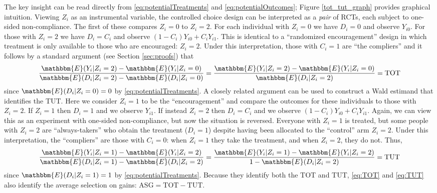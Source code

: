 \documentclass[12pt, a4paper]{article}
\begin{document}
The key insight can be read directly from \eqref{eq:potentialTreatments} and \eqref{eq:potentialOutcomes}; Figure \ref{tot_tut_graph} provides graphical intuition. %
Viewing $Z_i$ as an instrumental variable, the controlled choice design can be interpreted as a \emph{pair} of RCTs, each subject to one-sided non-compliance.
The first of these compares $Z_i=0$ to $Z_i = 2$. For each individual with $Z_i = 0$ we have $D_i = 0$ and observe $Y_{i0}$. For those with $Z_i = 2$ we have $D_i = C_i$ and observe $(1 - C_i) Y_{i0} + C_i Y_{i1}$. This is identical to a ``randomized encouragement'' design in which treatment is only available to those who are encouraged: $Z_i = 2$. Under this interpretation, those with $C_i = 1$ are ``the compliers'' and it follows by a standard argument (see Section \ref{sec:proofs}) that 
\begin{equation}
\frac{\mathbbm{E}(Y_i|Z_i=2) - \mathbbm{E}(Y_i|Z_i =0)}{\mathbbm{E}(D_i|Z_i=2)-\mathbbm{E}(D_i|Z_i=0)} = 
\frac{\mathbbm{E}(Y_i|Z_i=2) - \mathbbm{E}(Y_i|Z_i =0)}{\mathbbm{E}(D_i|Z_i=2)} = \text{TOT} 
\label{eq:TOT}
\end{equation}
since $\mathbbm{E}(D_i|Z_i=0)=0$ by \eqref{eq:potentialTreatments}. 
A closely related argument can be used to construct a Wald estimand that identifies the TUT. Here we consider $Z_i = 1$ to be the ``encouragement'' and compare the outcomes for these individuals to those with $Z_i = 2$. If $Z_i = 1$ then $D_i = 1$ and we observe $Y_{i1}$.
If instead $Z_i = 2$ then $D_i = C_i$ and we observe $(1 - C_i) Y_{i0} + C_i Y_{i1}$. Again, we can view this as an experiment with one-sided non-compliance, but now the situation is reversed. Everyone with $Z_i = 1$ is treated, but some people with $Z_i = 2$ are ``always-takers'' who obtain the treatment ($D_i = 1$) despite having been allocated to the ``control'' arm $Z_i=2$. Under this interpretation, the ``compliers'' are those with $C_i = 0$: when $Z_i=1$ they take the treatment, and when $Z_i=2$, they do not. Thus, 
\begin{equation}
\frac{\mathbbm{E}(Y_i|Z_i=1) - \mathbbm{E}(Y_i|Z_i =2)}{\mathbbm{E}(D_i|Z_i=1)-\mathbbm{E}(D_i|Z_i=2)} = 
\frac{\mathbbm{E}(Y_i|Z_i=1) - \mathbbm{E}(Y_i|Z_i =2)}{1 - \mathbbm{E}(D_i|Z_i=2)} = \text{TUT}
\label{eq:TUT}
\end{equation}
since $\mathbbm{E}(D_i|Z_i = 1)= 1$ by \eqref{eq:potentialTreatments}. 
Because they identify both the TOT and TUT, \eqref{eq:TOT} and \eqref{eq:TUT} also identify the average selection on gains: $\text{ASG} = \text{TOT} - \text{TUT}$.
\end{document}
